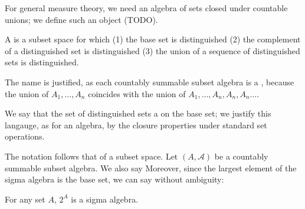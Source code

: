 
\sbasic


























\sstart
{}


For general measure theory,
we need an algebra of sets
closed under countable unions;
we define such an object (TODO).


A 
is a subset space for which
(1) the base set is distinguished
(2) the complement of a distinguished
set is distinguished
(3) the union of a sequence of distinguished sets
is distinguished.

The name is justified, as
each countably summable subset algebra is a
,
because the union of $A_1, \dots, A_n$
coincides with the union of
$A_1, \dots, A_n, A_n, A_n \dots$.

We say that the set of distinguished
sets a  on the
base set; we justify this langauge, as for
an algebra, by the closure properties
under standard set operations.


The notation follows that of a subset space.
Let $(A, \mathcal{A})$ be a countably summable
subset algebra.
We also say 
Moreover, since the largest element of the
sigma algebra is the base set, we can say without
ambiguity: 


\begin{expl}
  For any set $A$, $2^{A}$ is a sigma algebra.
\end{expl}

